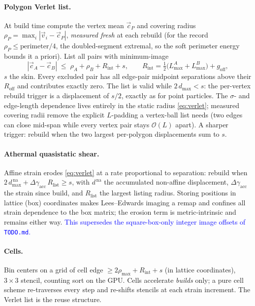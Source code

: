 \documentclass[11pt]{article}
\newcommand{\aside}[1]{\textcolor{blue}{#1}}
\begin{document}
\paragraph{Polygon Verlet list.}
At build time compute the vertex mean $\vec c_P$ and covering radius
$\rho_P=\max_i|\vec v_i-\vec c_P|$, \emph{measured fresh} at each rebuild (for the
record $\rho_P\le\text{perimeter}/4$, the doubled-segment extremal, so the soft
perimeter energy bounds it a priori).  List all pairs with minimum-image
\begin{equation}
  |\vec c_A-\vec c_B| \;\le\; \rho_A+\rho_B+R_{\text{int}}+s,
  \qquad
  R_{\text{int}}=\tfrac12\bigl(L^{A}_{\max}+L^{B}_{\max}\bigr)+g_{\text{off}},
  \label{eq:verlet}
\end{equation}
$s$ the skin.  Every excluded pair has all edge-pair midpoint separations above
their $R_{\text{off}}$ and contributes exactly zero.  The list is valid while
$2\,d_{\max}<s$: the per-vertex rebuild trigger is a displacement of $s/2$, exactly
as for point particles.  The $\sigma$- and edge-length dependence lives entirely in
the static radius \eqref{eq:verlet}; measured covering radii remove the explicit
$L$-padding a vertex-ball list needs (two edges can close mid-span while every
vertex pair stays $\mathcal O(L)$ apart).  A sharper trigger: rebuild when the two
largest per-polygon displacements sum to $s$.

\paragraph{Athermal quasistatic shear.}
Affine strain erodes \eqref{eq:verlet} at a rate proportional to separation:
rebuild when
$2\,d^{\,\text{na}}_{\max}+\Delta\gamma_{\text{acc}}\,R_{\text{list}}\ge s$, with
$d^{\,\text{na}}$ the accumulated non-affine displacement,
$\Delta\gamma_{\text{acc}}$ the strain since build, and $R_{\text{list}}$ the
largest listing radius.  Storing positions in lattice (box) coordinates makes
Lees--Edwards imaging \cite{LeesEdwards1972} a remap and confines all strain
dependence to the box matrix; the erosion term is metric-intrinsic and remains
either way.  \aside{This supersedes the square-box-only integer image offsets of
\texttt{TODO.md}.}

\paragraph{Cells.}
Bin centers on a grid of cell edge $\ge 2\rho_{\max}+R_{\text{int}}+s$ (in lattice
coordinates), $3\times3$ stencil, counting sort on the GPU.  Cells accelerate
\emph{builds} only; a pure cell scheme re-traverses every step and re-shifts
stencils at each strain increment.  The Verlet list is the reuse structure.
\end{document}
